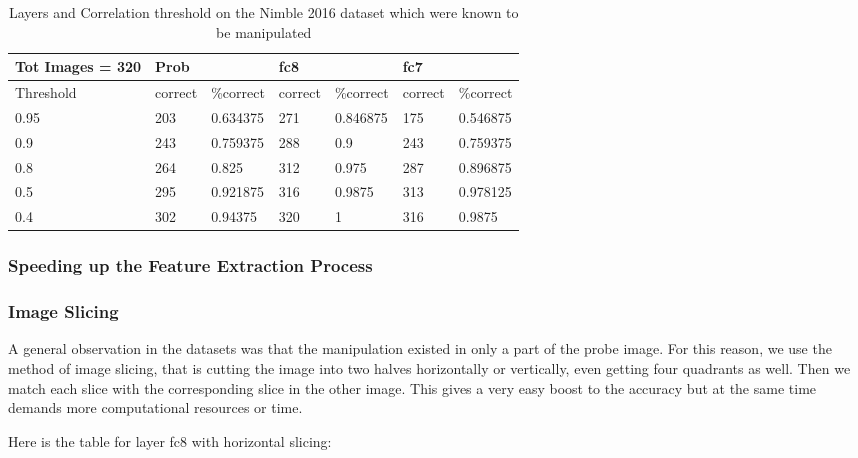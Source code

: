 \documentclass{article}
\begin{document}
\begin{table}[H]
\centering
\caption{Layers and Correlation threshold on the Nimble 2016 dataset which were known to be manipulated}
\label{lct}
\begin{tabular}{|l|l|l|l|l|ll|}
  \hline
  Tot Images = 320 & \multicolumn{2}{|l|}{Prob} & \multicolumn{2}{|l|}{fc8} & \multicolumn{2}{|l|}{fc7} \\
  \hline
  \multicolumn{1}{|l|}{Threshold} & correct    & \%correct   & correct   & \%correct   & correct   & \%correct   \\
  \hline
  0.95             & 203        & 0.634375    & 271       & 0.846875    & 175       & 0.546875    \\
  0.9              & 243        & 0.759375    & 288       & 0.9         & 243       & 0.759375    \\
  0.8              & 264        & 0.825       & 312       & 0.975       & 287       & 0.896875    \\
  0.5              & 295        & 0.921875    & 316       & 0.9875      & 313       & 0.978125    \\
  0.4              & 302        & 0.94375     & 320       & 1           & 316       & 0.9875      \\
  \hline

\end{tabular}
\end{table}

\subsubsection{Speeding up the Feature Extraction Process}

\subsubsection{Image Slicing}
A general observation in the datasets was that the manipulation existed in only a part of the probe image. For this reason, we use the method of image slicing, that is cutting the image into two halves horizontally or vertically, even getting four quadrants as well. Then we match each slice with the corresponding slice in the other image. This gives a very easy boost to the accuracy but at the same time demands more computational resources or time.

Here is the table for layer fc8 with horizontal slicing:
\end{document}

